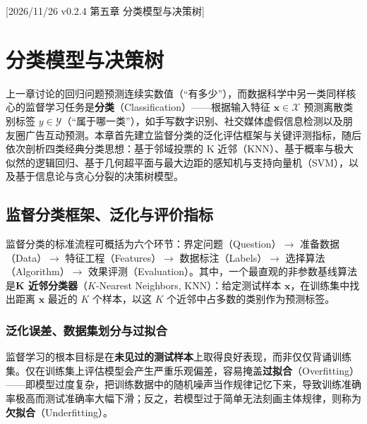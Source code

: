 %
%
[2026/11/26 v0.2.4 第五章 分类模型与决策树]
\chapter{分类模型与决策树}\label{ch:classification}

上一章讨论的回归问题预测连续实数值（“有多少”），而数据科学中另一类同样核心的监督学习任务是\textbf{分类}（Classification）——根据输入特征 $\bm{x}\in\mathcal{X}$ 预测离散类别标签 $y\in\mathcal{Y}$（“属于哪一类”），如手写数字识别、社交媒体虚假信息检测以及朋友圈广告互动预测。本章首先建立监督分类的泛化评估框架与关键评测指标，随后依次剖析四类经典分类思想：基于邻域投票的 K 近邻（KNN）、基于概率与极大似然的逻辑回归、基于几何超平面与最大边距的感知机与支持向量机（SVM），以及基于信息论与贪心分裂的决策树模型。

\section{监督分类框架、泛化与评价指标}\label{sec:clf-framework}

监督分类的标准流程可概括为六个环节：界定问题（Question）$\to$ 准备数据（Data）$\to$ 特征工程（Features）$\to$ 数据标注（Labels）$\to$ 选择算法（Algorithm）$\to$ 效果评测（Evaluation）。其中，一个最直观的非参数基线算法是\textbf{K 近邻分类器}（$K$-Nearest Neighbors, KNN）：给定测试样本 $\bm{x}$，在训练集中找出距离 $\bm{x}$ 最近的 $K$ 个样本，以这 $K$ 个近邻中占多数的类别作为预测标签。

\subsection{泛化误差、数据集划分与过拟合}

监督学习的根本目标是在\textbf{未见过的测试样本}上取得良好表现，而非仅仅背诵训练集。仅在训练集上评估模型会产生严重乐观偏差，容易掩盖\textbf{过拟合}（Overfitting）——即模型过度复杂，把训练数据中的随机噪声当作规律记忆下来，导致训练准确率极高而测试准确率大幅下滑；反之，若模型过于简单无法刻画主体规律，则称为\textbf{欠拟合}（Underfitting）。

